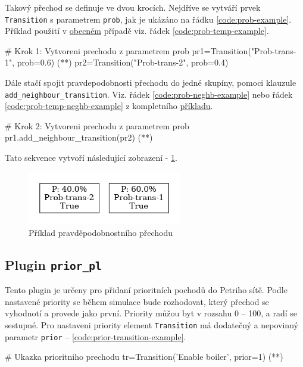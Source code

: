 Takový přechod se definuje ve dvou krocích. Nejdříve se vytváří prvek \texttt{Transition} s parametrem \texttt{prob}, jak je ukázáno na řádku \ref{code:prob-example}. Příklad použití v \hyperref[code:prob-ev-draw]{obecném} případě viz. řádek \ref{code:prob-temp-example}.
\begin{python}
  # Krok 1: Vytvoreni prechodu z parametrem prob
  pr1=Transition("Prob-trans-1", prob=0.6) (*\label{code:prob-example}*)
  pr2=Transition("Prob-trans-2", prob=0.4)
\end{python}

Dále stačí spojit pravdepodobnosti přechodu do jedné skupíny, pomoci klauzule \\ \texttt{add\_neighbour\_transition}. Viz. řádek \ref{code:prob-neghb-example} nebo řádek \ref{code:prob-temp-neghb-example} z kompletního \hyperref[code:prob-ev-draw]{příkladu}.
\begin{python}
  # Krok 2: Vytvoreni prechodu z parametrem prob
  pr1.add_neighbour_transition(pr2) (*\label{code:prob-neghb-example}*)
\end{python}

Tato sekvence vytvoří následující zobrazení - \ref{prob-transition}.

\begin{figure}[hbt]
  \centering
  \includegraphics[width=0.6\textwidth]{obrazky-figures/prob-transition.png}
  \caption{Příklad pravděpodobnostního přechodu}
  \label{prob-transition}
\end{figure}

\subsection{Plugin \texttt{prior\_pl}}
\label{subsec:prior_pl}
Tento plugin je určeny pro přidaní prioritních pochodů do Petriho sítě. Podle nastavené priority se během simulace bude rozhodovat, který přechod se vyhodnotí a provede jako první. Priority můžou byt v rozsahu 0 -- 100, a radí se sestupné. Pro nastaveni priority element \texttt{Transition} má dodatečný a nepovinný parametr \texttt{prior} -- \ref{code:prior-transition-example}.
\begin{python}
  # Ukazka prioritniho prechodu
  tr=Transition('Enable boiler', prior=1) (*\label{code:prior-transition-example}*)
\end{python}

